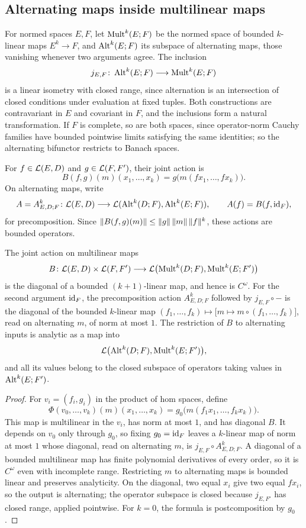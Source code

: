 \subsection{Alternating maps inside multilinear maps}

For normed spaces $E,F$, let $\operatorname{Mult}^k(E;F)$ be the normed space of bounded $k$-linear maps $E^k\to F$, and $\operatorname{Alt}^k(E;F)$ its subspace of alternating maps, those vanishing whenever two arguments agree. The inclusion
\[
 j_{E,F}\colon\operatorname{Alt}^k(E;F)\longrightarrow\operatorname{Mult}^k(E;F)
\]
is a linear isometry with closed range, since alternation is an intersection of closed conditions under evaluation at fixed tuples. Both constructions are contravariant in $E$ and covariant in $F$, and the inclusions form a natural transformation. If $F$ is complete, so are both spaces, since operator-norm Cauchy families have bounded pointwise limits satisfying the same identities; so the alternating bifunctor restricts to Banach spaces.

For $f\in\mathcal L(E,D)$ and $g\in\mathcal L(F,F')$, their joint action is
\[
 B(f,g)(m)(x_1,\ldots,x_k)
 =g\bigl(m(fx_1,\ldots,fx_k)\bigr).
\]
On alternating maps, write
\[
 A=A^k_{E,D;F}\colon\mathcal L(E,D)\longrightarrow
 \mathcal L(\operatorname{Alt}^k(D;F),\operatorname{Alt}^k(E;F)),\qquad A(f)=B(f,\mathrm{id}_F),
\]
for precomposition. Since $\lVert B(f,g)(m)\rVert\le\lVert g\rVert\,\lVert m\rVert\,\lVert f\rVert^k$, these actions are bounded operators.

\begin{proposition}\label{prop:ambient-polynomial}
The joint action on multilinear maps
\[
 B\colon\mathcal L(E,D)\times\mathcal L(F,F')
 \longrightarrow\mathcal L\bigl(\operatorname{Mult}^k(D;F),\operatorname{Mult}^k(E;F')\bigr)
\]
is the diagonal of a bounded $(k+1)$-linear map, and hence is $C^\omega$. For the second argument $\mathrm{id}_F$, the precomposition action $A^k_{E,D;F}$ followed by $j_{E,F}\circ{-}$ is the diagonal of the bounded $k$-linear map $(f_1,\ldots,f_k)\mapsto\bigl[m\mapsto m\circ(f_1,\ldots,f_k)\bigr]$, read on alternating $m$, of norm at most $1$. The restriction of $B$ to alternating inputs is analytic as a map into
\[
 \mathcal L\bigl(\operatorname{Alt}^k(D;F),\operatorname{Mult}^k(E;F')\bigr),
\]
and all its values belong to the closed subspace of operators taking values in $\operatorname{Alt}^k(E;F')$.
\end{proposition}

\begin{proof}
For $v_i=(f_i,g_i)$ in the product of hom spaces, define
\[
 \Phi(v_0,\ldots,v_k)(m)(x_1,\ldots,x_k)
 =g_0\bigl(m(f_1x_1,\ldots,f_kx_k)\bigr).
\]
This map is multilinear in the $v_i$, has norm at most $1$, and has diagonal $B$. It depends on $v_0$ only through $g_0$, so fixing $g_0=\mathrm{id}_F$ leaves a $k$-linear map of norm at most $1$ whose diagonal, read on alternating $m$, is $j_{E,F}\circ A^k_{E,D;F}$. A diagonal of a bounded multilinear map has finite polynomial derivatives of every order, so it is $C^\omega$ even with incomplete range. Restricting $m$ to alternating maps is bounded linear and preserves analyticity. On the diagonal, two equal $x_i$ give two equal $fx_i$, so the output is alternating; the operator subspace is closed because $j_{E,F'}$ has closed range, applied pointwise. For $k=0$, the formula is postcomposition by $g_0$.
\end{proof}

